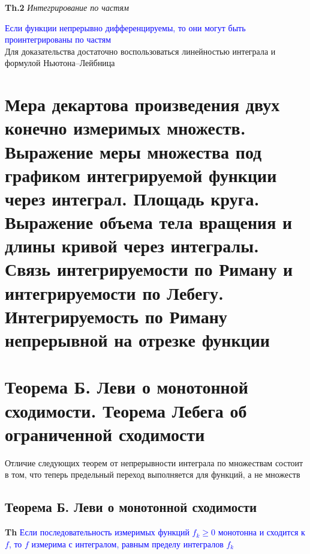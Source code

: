 \documentclass[a4paper, 14pt]{article}
\begin{document}
    \textbf{Th.2} \textit{Интегрирование по частям}

    \textcolor{blue}{Если функции непрерывно дифференцируемы, то они могут быть проинтегрированы по частям} \\

    Для доказательства достаточно воспользоваться линейностью интеграла и формулой Ньютона–Лейбница

    \section{Мера декартова произведения двух конечно измеримых множеств.
    Выражение меры множества под графиком интегрируемой функции через интеграл.
    Площадь круга.
    Выражение объема тела вращения и длины кривой через интегралы.
    Связь интегрируемости по Риману и интегрируемости по Лебегу.
    Интегрируемость по Риману непрерывной на отрезке функции}

    

    \section{Теорема Б. Леви о монотонной сходимости.
    Теорема Лебега об ограниченной сходимости}

    Отличие следующих теорем от непрерывности интеграла по множествам состоит в том, что теперь предельный переход
    выполняется для функций, а не множеств

    \subsection{Теорема Б. Леви о монотонной сходимости}

    \textbf{Th} \textcolor{blue}{Если последовательность измеримых функций $f_k \geq 0$ монотонна и сходится к $f$,
        то $f$ измерима с интегралом, равным пределу интегралов $f_k$}
\end{document}
